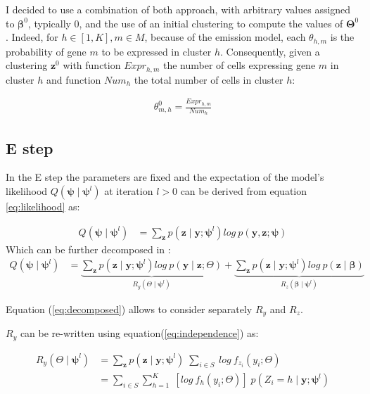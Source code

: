 I decided to use a combination of both approach, with arbitrary values assigned to $\boldsymbol{\beta}^{0}$, typically $0$, and the use of an initial clustering to compute the values of $\boldsymbol{\Theta}^{0}$. Indeed, for $h \in [1,K], m \in M$, because of the emission model, each $\theta_{h,m}$ is the probability of gene $m$ to be expressed in cluster $h$. Consequently, given a clustering $\boldsymbol{z}^{0}$ with function $Expr_{h,m}$ the number of cells expressing gene $m$ in cluster $h$ and function $Num_h$ the total number of cells in cluster $h$:

\begin{align*}
\theta_{m,h}^{0} = \frac{Expr_{h,m}}{Num_h}
\end{align*}

	\subsection{E step}

In the E step the parameters are fixed and the expectation of the model's likelihood $Q(\boldsymbol{\psi} \mid \boldsymbol{\psi}^{l})$ at iteration $l > 0$ can be derived from equation \ref{eq:likelihood} as:

\begin{align}
Q(\boldsymbol{\psi} \mid \boldsymbol{\psi}^{l}) &= \sum\limits_{\boldsymbol{z}} p(\boldsymbol{z} \mid \boldsymbol{y} ; \boldsymbol{\psi}^{l}) log\:p(\boldsymbol{y},\boldsymbol{z};\boldsymbol{\psi}) \nonumber
\end{align}
Which can be further decomposed in :
\begin{align}
\label{eq:decomposed}
Q(\boldsymbol{\psi} \mid \boldsymbol{\psi}^{l}) &= \underbrace{\sum\limits_{\boldsymbol{z}} p(\boldsymbol{z} \mid \boldsymbol{y} ; \boldsymbol{\psi}^{l}) log\:p(\boldsymbol{y} \mid \boldsymbol{z} ; \Theta)}_{R_y(\Theta\mid \boldsymbol{\psi}^l)} 
 + \underbrace{\sum\limits_{\boldsymbol{z}} p(\boldsymbol{z} \mid \boldsymbol{y} ; \boldsymbol{\psi}^{l}) log\:p(\boldsymbol{z} \mid \boldsymbol{\beta})}_{R_z(\boldsymbol{\beta}\mid \boldsymbol{\psi}^l)}
\end{align}

Equation (\ref{eq:decomposed}) allows to consider separately $R_y$ and $R_z$.


$R_y$ can be re-written using equation(\ref{eq:independence}) as:

\begin{align*}
R_y(\Theta\mid \boldsymbol{\psi}^l) &= \sum\limits_{\boldsymbol{z}} p(\boldsymbol{z}\mid \boldsymbol{y} ; \boldsymbol{\psi}^{l})\;\sum\limits_{i \in S}\: log\: f_{z_i} (y_i ; \Theta)\\
&= \sum\limits_{i \in S} \sum\limits_{h=1}^{K}\; \left[log\: f_{h} (y_i  ; \Theta) \right] \; p(Z_i = h \mid \boldsymbol{y};\boldsymbol{\psi}^{l})
\end{align*}  

